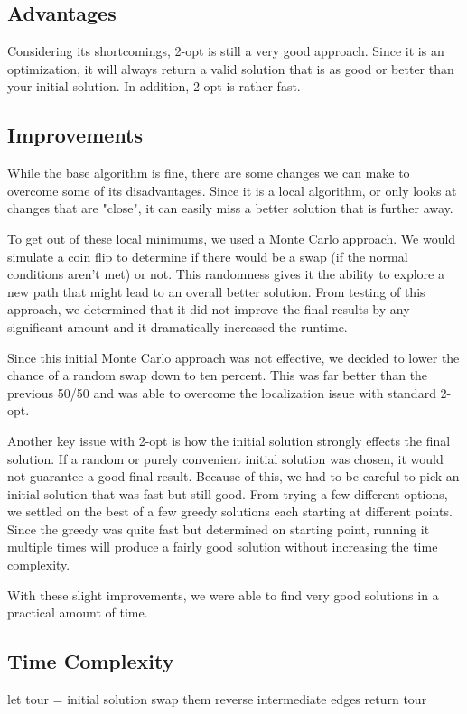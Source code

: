 \documentclass[12pt]{report}
\begin{document}
\begin{multicols}{2}
    \subsection{Advantages}
    Considering its shortcomings, 2-opt is still a very good approach. Since it is an optimization, it will always return a valid solution that is as good or better than your initial solution. In addition, 2-opt is rather fast.
    \subsection{Improvements}
    While the base algorithm is fine, there are some changes we can make to overcome some of its disadvantages. Since it is a local algorithm, or only looks at changes that are "close", it can easily miss a better solution that is further away.

    To get out of these local minimums, we used a Monte Carlo approach. We would simulate a coin flip to determine if there would be a swap (if the normal conditions aren't met) or not. This randomness gives it the ability to explore a new path that might lead to an overall better solution. From testing of this approach, we determined that it did not improve the final results by any significant amount and it dramatically increased the runtime.

    Since this initial Monte Carlo approach was not effective, we decided to lower the chance of a random swap down to ten percent. This was far better than the previous 50/50 and was able to overcome the localization issue with standard 2-opt.

    Another key issue with 2-opt is how the initial solution strongly effects the final solution. If a random or purely convenient initial solution was chosen, it would not guarantee a good final result. Because of this, we had to be careful to pick an initial solution that was fast but still good. From trying a few different options, we settled on the best of a few greedy solutions each starting at different points. Since the greedy was quite fast but determined on starting point, running it multiple times will produce a fairly good solution without increasing the time complexity.

    With these slight improvements, we were able to find very good solutions in a practical amount of time.
\end{multicols}

\subsection{Time Complexity}
\begin{algorithm}
\caption{2-opt algorithm}
\label{2opt_Alg}
\begin{algorithmic}[1]
    \State let tour = initial solution
    \State swap them
    \State reverse intermediate edges
    \EndIf
    \EndFor
    \EndWhile
    \State return tour
\EndProcedure
\end{algorithmic}
\end{algorithm}
\end{document}
